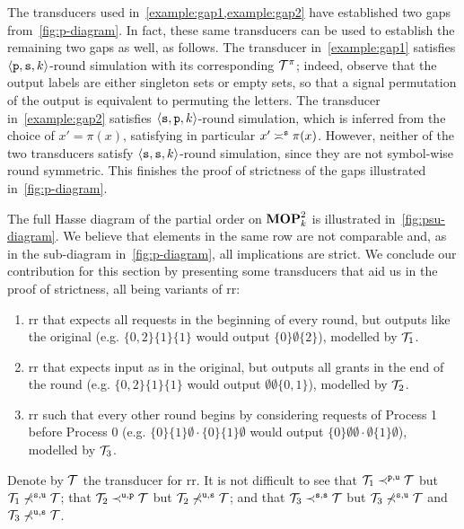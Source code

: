 The transducers used in~\cref{example:gap1,example:gap2} have established two gaps from~\cref{fig:p-diagram}. In fact, these same transducers can be used to establish the remaining two gaps as well, as follows. The transducer in~\cref{example:gap1} satisfies $\tup{\rstype{p},\rstype{s},k}$-round simulation with its corresponding $\cT^\pi$; indeed, observe that the output labels are either singleton sets or empty sets, so that a signal permutation of the output is equivalent to permuting the letters. The transducer in~\cref{example:gap2} satisfies $\tup{\rstype{s},\rstype{p},k}$-round simulation, which is inferred from the choice of $x'=\pi(x)$, satisfying in particular $x'\reqtype[]{s} \pi(x)$. However, neither of the two transducers satisfy $\tup{\rstype{s},\rstype{s},k}$-round simulation, since they are not symbol-wise round symmetric. This finishes the proof of strictness of the gaps illustrated in~\cref{fig:p-diagram}.

The full Hasse diagram of the partial order on $\RSTUPS$ is illustrated in~\cref{fig:psu-diagram}. We believe that elements in the same row are not comparable and, as in the sub-diagram in~\cref{fig:p-diagram}, all implications are strict. We conclude our contribution for this section by presenting some transducers that aid us in the proof of strictness, all being variants of \gls{rr}:
\begin{enumerate}
    \item \Gls{rr} that expects all requests in the beginning of every round, but outputs like the original (e.g. $\{0,2\}\{1\}\{1\}$ would output $\{0\}\emptyset\{2\}$), modelled by $\cT_1$.
    \item \Gls{rr} that expects input as in the original, but outputs all grants in the end of the round (e.g. $\{0,2\}\{1\}\{1\}$ would output $\emptyset\emptyset\{0,1\}$), modelled by $\cT_2$.
    \item \Gls{rr} such that every other round begins by considering requests of Process 1 before Process 0 (e.g. $\{0\}\{1\}\emptyset\cdot\{0\}\{1\}\emptyset$ would output $\{0\}\emptyset\emptyset\cdot\emptyset\{1\}\emptyset$), modelled by $\cT_3$.
\end{enumerate}
Denote by $\cT$ the transducer for \gls{rr}. It is not difficult to see that $\cT_1\prectype{p}{u} \cT$ but $\cT_1\not\prectype{s}{u} \cT$; that $\cT_2\prectype{u}{p} \cT$ but $\cT_2\not\prectype{u}{s} \cT$; and that $\cT_3\prectype{s}{s} \cT$ but $\cT_3\not\prectype{s}{u} \cT$ and $\cT_3\not\prectype{u}{s} \cT$.

